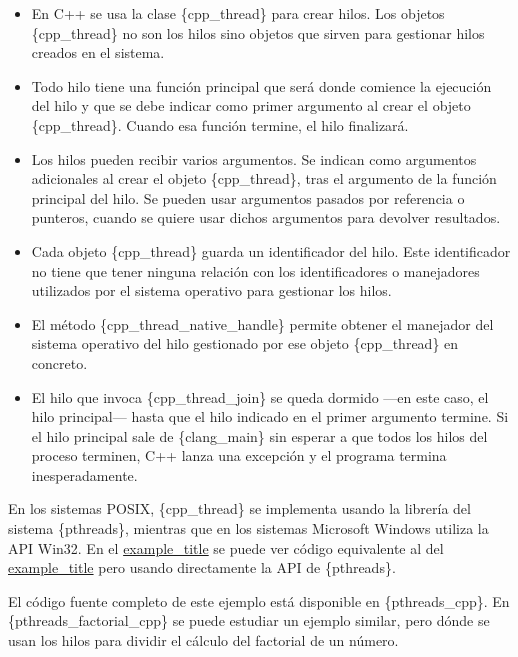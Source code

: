 \begin{itemize}
\item
  En C++ se usa la clase \{cpp\_thread\} para crear hilos. Los objetos
  \{cpp\_thread\} no son los hilos sino objetos que sirven para
  gestionar hilos creados en el sistema.
\item
  Todo hilo tiene una función principal que será donde comience la
  ejecución del hilo y que se debe indicar como primer argumento al
  crear el objeto \{cpp\_thread\}. Cuando esa función termine, el hilo
  finalizará.
\item
  Los hilos pueden recibir varios argumentos. Se indican como argumentos
  adicionales al crear el objeto \{cpp\_thread\}, tras el argumento de
  la función principal del hilo. Se pueden usar argumentos pasados por
  referencia o punteros, cuando se quiere usar dichos argumentos para
  devolver resultados.
\item
  Cada objeto \{cpp\_thread\} guarda un identificador del hilo. Este
  identificador no tiene que tener ninguna relación con los
  identificadores o manejadores utilizados por el sistema operativo para
  gestionar los hilos.
\item
  El método \{cpp\_thread\_native\_handle\} permite obtener el manejador
  del sistema operativo del hilo gestionado por ese objeto
  \{cpp\_thread\} en concreto.
\item
  El hilo que invoca \{cpp\_thread\_join\} se queda dormido ---en este
  caso, el hilo principal--- hasta que el hilo indicado en el primer
  argumento termine. Si el hilo principal sale de \{clang\_main\} sin
  esperar a que todos los hilos del proceso terminen, C++ lanza una
  excepción y el programa termina inesperadamente.
\end{itemize}

En los sistemas POSIX, \{cpp\_thread\} se implementa usando la librería
del sistema \{pthreads\}, mientras que en los sistemas Microsoft Windows
utiliza la API Win32. En el \hyperref[ejemplo-pthread]{example\_title}
se puede ver código equivalente al del
\hyperref[ejemplo-thread]{example\_title} pero usando directamente la
API de \{pthreads\}.

El código fuente completo de este ejemplo está disponible en
\{pthreads\_cpp\}. En \{pthreads\_factorial\_cpp\} se puede estudiar un
ejemplo similar, pero dónde se usan los hilos para dividir el cálculo
del factorial de un número.

